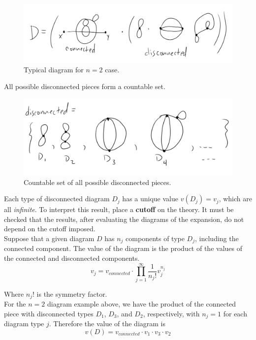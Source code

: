 \begin{figure}[H]
	\centering
	\includegraphics[scale=0.4]{images/n2diagrams.png}
	\caption{Typical diagram for $n=2$ case.}
\end{figure}

\noindent All possible disconnected pieces form a countable set. 

\begin{figure}[H]
	\centering
	\includegraphics[scale=0.4]{images/countable.png}
	\caption{Countable set of all possible disconnected pieces.}
\end{figure}

\noindent Each type of disconnected diagram $D_j$ has a unique value $v(D_j)=v_j$, which are all \textit{infinite}. To interpret this result, place a \textbf{cutoff} on the theory. It must be checked that the results, after evaluating the diagrams of the expansion, do not depend on the cutoff imposed. \\

\noindent Suppose that a given diagram $D$ has $n_j$ components of type $D_j$, including the connected component. The value of the diagram is the product of the values of the connected and disconnected components.
\begin{equation}
v_j = v_{connected} \cdot \prod_{j=1}^{\infty} \frac{1}{n_j !} v_j^{n_j}
\end{equation}

\noindent Where $n_j !$ is the symmetry factor. \\

\noindent For the $n=2$ diagram example above, we have the product of the connected piece with disconnected types $D_1$, $D_3$, and $D_2$, respectively, with $n_j=1$ for each diagram type $j$. Therefore the value of the diagram is
\begin{equation}
v(D) = v_{connected} \cdot v_1 \cdot v_3 \cdot v_2
\end{equation}

